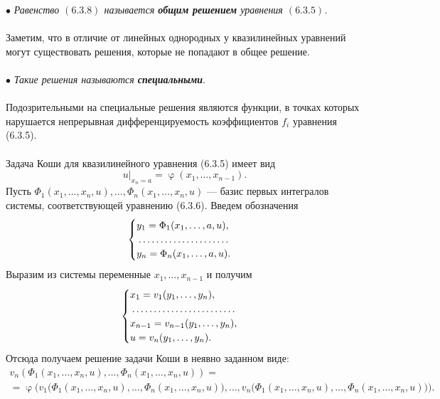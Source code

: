 \documentclass[a4paper, 12pt]{report}
\newcommand{\FI}{\Phi}
\renewcommand{\varphi}{\upvarphi}
\begin{document}
	$\bullet$ \textit{Равенство $(6.3.8)$ называется \textbf{общим решением} уравнения $(6.3.5)$.}\\\\
	Заметим, что в отличие от линейных однородных у квазилинейных уравнений могут существовать решения, которые не попадают в общее решение.\\\\
	$\bullet$ \textit{Такие решения называются \textbf{специальными}}.\\\\
	Подозрительными на специальные решения являются функции, в точках которых нарушается непрерывная дифференцируемость коэффициентов $f_i$ уравнения (6.3.5).\\\\
	Задача Коши для квазилинейного уравнения (6.3.5) имеет вид $$u|_{x_n = a} = \varphi(x_1,\ldots, x_{n-1}).$$
	Пусть $\FI_1(x_1,\ldots,x_n,u), \ldots, \FI_n(x_1,\ldots,x_n,u)$ --- базис первых интегралов системы, соответствующей уравнению (6.3.6). Введем обозначения $$\begin{cases}
		y_1 = \FI_1(x_1,\ldots, a, u),\\
		\dotfill\\
		y_n = \FI_n(x_1,\ldots, a, u).
	\end{cases}$$
	Выразим из системы переменные $x_1,\ldots, x_{n-1}$ и получим $$\begin{cases}
		x_1 = v_1(y_1,\ldots, y_n),\\
		\dotfill\\
		x_{n-1} = v_{n-1}(y_1,\ldots, y_n),\\
		u = v_n(y_1,\ldots, y_n).
	\end{cases}$$
	Отсюда получаем решение задачи Коши в неявно заданном виде: \begin{multline*}
		v_n(\FI_1(x_1,\ldots,x_n,u), \ldots, \FI_n(x_1,\ldots,x_n,u)) =\\= \varphi\Big(v_1\big(\FI_1(x_1,\ldots,x_n,u), \ldots, \FI_n(x_1,\ldots,x_n,u)\big),\ldots, v_n\big(\FI_1(x_1,\ldots,x_n,u), \ldots, \FI_n(x_1,\ldots,x_n,u)\big)\Big).
	\end{multline*}
\end{document}
